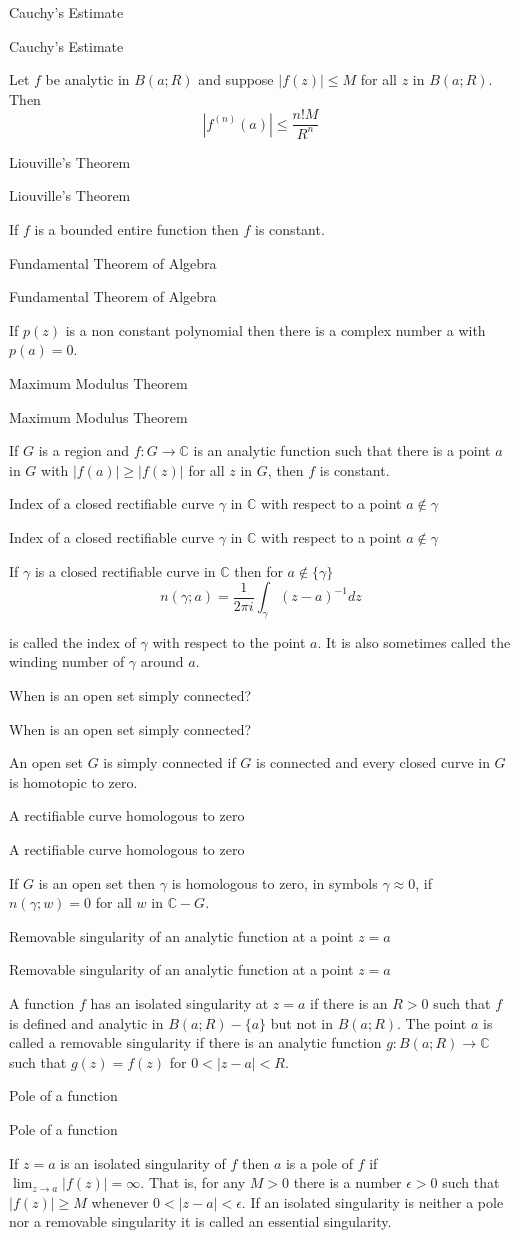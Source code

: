 \documentclass[17pt]{extarticle}
\newcommand{\boxset}[2]{\begin{mdframed}[style=darkQuesion]
  #1
    \end{mdframed}
    \newpage
    \begin{mdframed}[style=darkQuesion]
      #1
        \end{mdframed}
    \begin{mdframed}[style=darkAnswer]
      #2
        \end{mdframed}
        \newpage
  }
\begin{document}
\boxset{Cauchy's Estimate}
{ Let $f$ be analytic in $B(a ; R)$ and suppose $|f(z)| \leq M$ for all $z$ in $B(a ; R)$. Then
\[\left|f^{(n)}(a)\right| \leq \frac{n ! M}{R^{n}}\]
}
\boxset{Liouville's Theorem}
{ If $f$ is a bounded entire function then $f$ is constant.}
\boxset{Fundamental Theorem of Algebra}
{ If $p(z)$ is a non constant polynomial then there is a complex number a with $p(a)=0$.}
\boxset{Maximum Modulus Theorem}
{ If $G$ is a region and $f: G \rightarrow \mathbb{C}$ is an analytic function such that there is a point $a$ in $G$ with $|f(a)| \geq|f(z)|$ for all $z$ in $G$, then $f$ is constant.}
\boxset{Index of a closed rectifiable curve $\gamma$ in $\mathbb{C}$ with respect to a point $a \notin \gamma$}
{ If $\gamma$ is a closed rectifiable curve in $\mathbb{C}$ then for $a \notin\{\gamma\}$
\[n(\gamma ; a)=\frac{1}{2 \pi i} \int_{\gamma}(z-a)^{-1} d z\]

is called the index of $\gamma$ with respect to the point $a$. It is also sometimes called the winding number of $\gamma$ around $a$.}
\boxset{When is an open set simply connected?}
{ An open set $G$ is simply connected if $G$ is connected and every closed curve in $G$ is homotopic to zero.}
\boxset{A rectifiable curve homologous to zero}
{ If $G$ is an open set then $\gamma$ is homologous to zero, in symbols $\gamma \approx 0$, if $n(\gamma ; w)=0$ for all $w$ in $\mathbb{C}-G$.}
\boxset{Removable singularity of an analytic function at a point $z=a$}
{ A function $f$ has an isolated singularity at $z=a$ if there is an $R>0$ such that $f$ is defined and analytic in $B(a ; R)-\{a\}$ but not in $B(a ; R)$. The point $a$ is called a removable singularity if there is an analytic function $g: B(a ; R) \rightarrow \mathbb{C}$ such that $g(z)=f(z)$ for $0<|z-a|<R$.}
\boxset{Pole of a function}
{If $z=a$ is an isolated singularity of $f$ then $a$ is a pole of $f$ if $\lim _{z \rightarrow a}|f(z)|=\infty$. That is, for any $M>0$ there is a number $\epsilon>0$ such that $|f(z)| \geq M$ whenever $0<|z-a|<\epsilon$. If an isolated singularity is neither a pole nor a removable singularity it is called an essential singularity.}
\end{document}
